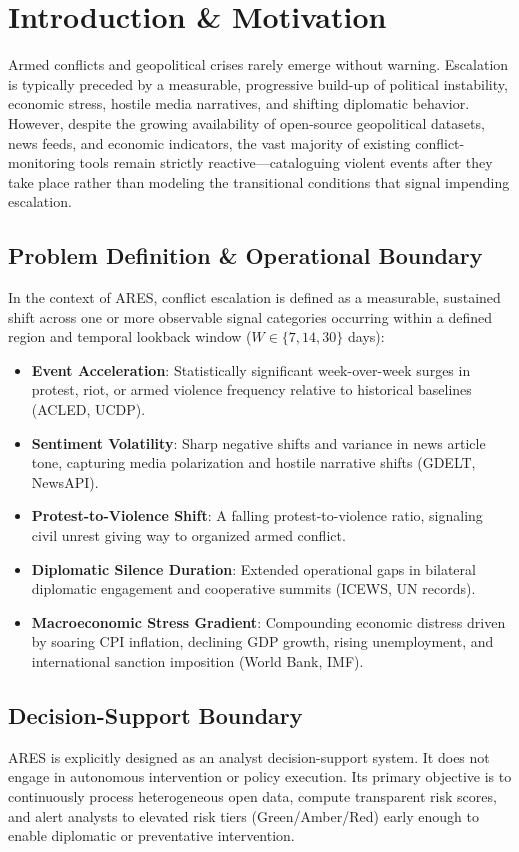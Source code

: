 \documentclass[conference]{IEEEtran}
\begin{document}
\section{Introduction \& Motivation}
Armed conflicts and geopolitical crises rarely emerge without warning. Escalation is typically preceded by a measurable, progressive build-up of political instability, economic stress, hostile media narratives, and shifting diplomatic behavior. However, despite the growing availability of open-source geopolitical datasets, news feeds, and economic indicators, the vast majority of existing conflict-monitoring tools remain strictly reactive—cataloguing violent events after they take place rather than modeling the transitional conditions that signal impending escalation.

\subsection{Problem Definition \& Operational Boundary}
In the context of ARES, conflict escalation is defined as a measurable, sustained shift across one or more observable signal categories occurring within a defined region and temporal lookback window ($W \in \{7, 14, 30\}$ days):
\begin{itemize}
    \item \textbf{Event Acceleration}: Statistically significant week-over-week surges in protest, riot, or armed violence frequency relative to historical baselines (ACLED, UCDP).
    \item \textbf{Sentiment Volatility}: Sharp negative shifts and variance in news article tone, capturing media polarization and hostile narrative shifts (GDELT, NewsAPI).
    \item \textbf{Protest-to-Violence Shift}: A falling protest-to-violence ratio, signaling civil unrest giving way to organized armed conflict.
    \item \textbf{Diplomatic Silence Duration}: Extended operational gaps in bilateral diplomatic engagement and cooperative summits (ICEWS, UN records).
    \item \textbf{Macroeconomic Stress Gradient}: Compounding economic distress driven by soaring CPI inflation, declining GDP growth, rising unemployment, and international sanction imposition (World Bank, IMF).
\end{itemize}

\subsection{Decision-Support Boundary}
ARES is explicitly designed as an analyst decision-support system. It does not engage in autonomous intervention or policy execution. Its primary objective is to continuously process heterogeneous open data, compute transparent risk scores, and alert analysts to elevated risk tiers (Green/Amber/Red) early enough to enable diplomatic or preventative intervention.
\end{document}
